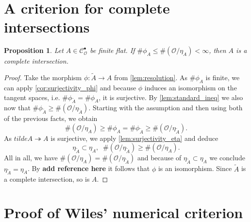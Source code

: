 \documentclass{article}
\theoremstyle{plain}%
\newtheorem{proposition}{Proposition}[section]
\theoremstyle{definition}
\theoremstyle{remark}
\newcommand{\cob}{\mathcal{C}_\mathcal{O}^\bullet}
\begin{document}
\section{A criterion for complete intersections}

\begin{proposition}\cite[theorem 5.27]{darmon1995fermat}\label{prop:criterionCI}
    Let \(A \in \cob\) be finite flat. If \(\# \phi_A \leq \#(\mathcal{O}/\eta_A) < \infty\), 
    then \(A\) is a complete intersection.
\end{proposition}
    
\begin{proof}
    Take the morphism \(\phi\colon \tilde{A} \to A\) from \cref{lem:resolution}.
    As \(\# \phi_A\) is finite, we can apply \cref{cor:surjectivity_phi} and because \(\phi\)
    induces an isomorphism on the tangent spaces, i.e. \(\# \phi_{\tilde{A}} = \#\phi_A\), it is surjective.
    By \cref{lem:standard_ineq} we also now that \(\#\phi_{\tilde{A}} \geq \#(\mathcal{O}/\eta_{\tilde{A}})\).
    Starting with the assumption and then using both of the previous facts, we obtain
    \[
        \#(\mathcal{O}/\eta_A) \geq \#\phi_A = \#\phi_{\tilde{A}} \geq \#(\mathcal{O}/\eta_{\tilde{A}}).
    \]
    As \(tilde{A} \twoheadrightarrow A\) is surjective, we apply \cref{lem:surjectivity_eta} 
    and deduce 
    \[
        \eta_{\tilde{A}} \subset \eta_A, \;\; \#(\mathcal{O}/\eta_{\tilde{A}}) \geq \#(\mathcal{O}/\eta_A).
    \]
    All in all, we have \(\#(\mathcal{O}/\eta_A) = \#(\mathcal{O}/\eta_{\tilde{A}})\) and because of
    \(\eta_{\tilde{A}} \subset \eta_A\) we conclude \(\eta_{\tilde{A}} = \eta_A\).
    By \textbf{add reference here} it follows that \(\phi\) is an isomorphism.
    Since \(\tilde{A}\) is a complete intersection, so is \(A\).
\end{proof}

\section{Proof of Wiles' numerical criterion}


\newpage
\printbibliography
\end{document}
